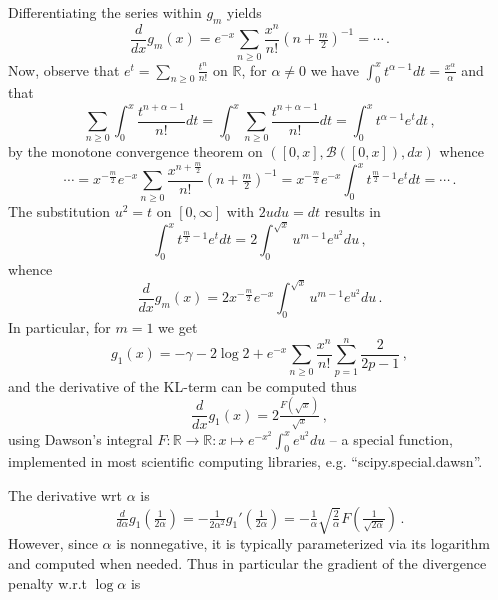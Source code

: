 \documentclass[a4paper,10pt]{article}
\begin{document}
Differentiating the series within $g_m$ yields
$$
\frac{d}{d x} g_m(x)
  = e^{-x} \sum_{n\geq 0} \frac{x^n}{n!} (n + \tfrac{m}2)^{-1}
  = \cdots
  \,. $$
Now, observe that $
    e^t  = \sum_{n\geq 0} \tfrac{t^n}{n!}
$ on $\mathbb{R}$, for $\alpha\neq 0$ we have $
  \int_0^x t^{\alpha-1} dt
    = \tfrac{x^\alpha}{\alpha}
$ and that
$$
\sum_{n\geq 0} \int_0^x \frac{t^{n+\alpha-1}}{n!} dt
  = \int_0^x \sum_{n\geq 0} \frac{t^{n+\alpha-1}}{n!} dt
  = \int_0^x t^{\alpha-1} e^t dt
  \,, $$
by the monotone convergence theorem on $
  ([0, x], \mathcal{B}([0, x]), dx)
$ whence
$$
\cdots
  = x^{-\tfrac{m}2} e^{-x} \sum_{n\geq 0}
      \frac{x^{n + \tfrac{m}2}}{n!} (n + \tfrac{m}2)^{-1}
  = x^{-\tfrac{m}2} e^{-x}
      \int_0^x t^{\tfrac{m}2 - 1} e^t dt
  = \cdots
  \,. $$
The substitution $u^2 = t$ on $[0, \infty]$ with $2u du = dt$ results in
$$
\int_0^x t^{\tfrac{m}2 - 1} e^t  dt
  = 2 \int_0^{\sqrt{x}} u^{m - 1} e^{u^2} du
  \,, $$
whence
$$
\frac{d}{d x} g_m(x)
  = 2 x^{-\tfrac{m}2} e^{-x}
      \int_0^{\sqrt{x}} u^{m - 1} e^{u^2} du
  \,. $$
In particular, for $m=1$ we get
$$
g_1(x)
  = - \gamma - 2 \log{2}
  + e^{-x} \sum_{n\geq 0} \frac{x^n}{n!} \sum_{p=1}^n \frac2{2p - 1}
  \,, $$
and the derivative of the KL-term can be computed thus 
$$
\frac{d}{d x} g_1(x)
  = 2 \tfrac{F(\sqrt{x})}{\sqrt{x}}
  \,, $$
using Dawson's integral $
  F \colon \mathbb{R} \to \mathbb{R}
  \colon x \mapsto e^{-x^2} \int_0^x e^{u^2} du
$ -- a special function, implemented in most scientific computing libraries, e.g.
``scipy.special.dawsn''.

The derivative wrt $\alpha$ is 
$$
\tfrac{d}{d \alpha} g_1(\tfrac1{2\alpha})
  = -\tfrac1{2 \alpha^2} g_1'(\tfrac1{2\alpha})
  = -\tfrac1{\alpha} \sqrt{\tfrac2{\alpha}} F(\tfrac1{\sqrt{2\alpha}})
  \,. $$
However, since $\alpha$ is nonnegative, it is typically parameterized via its logarithm
and computed when needed. Thus in particular the gradient of the divergence penalty w.r.t
$\log \alpha$ is
\end{document}
